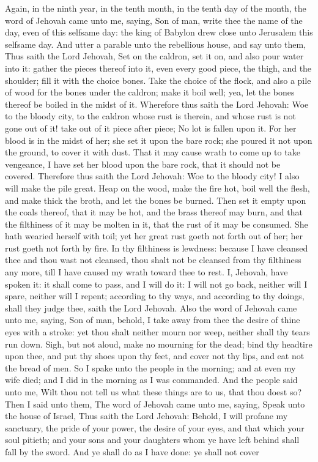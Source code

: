 Again, in the ninth year, in the tenth month, in the tenth day of the month, the word of Jehovah came unto me, saying, Son of man, write thee the name of the day, even of this selfsame day: the king of Babylon drew close unto Jerusalem this selfsame day. And utter a parable unto the rebellious house, and say unto them, Thus saith the Lord Jehovah, Set on the caldron, set it on, and also pour water into it: gather the pieces thereof into it, even every good piece, the thigh, and the shoulder; fill it with the choice bones. Take the choice of the flock, and also a pile of wood for the bones under the caldron; make it boil well; yea, let the bones thereof be boiled in the midst of it.  Wherefore thus saith the Lord Jehovah: Woe to the bloody city, to the caldron whose rust is therein, and whose rust is not gone out of it! take out of it piece after piece; No lot is fallen upon it. For her blood is in the midst of her; she set it upon the bare rock; she poured it not upon the ground, to cover it with dust. That it may cause wrath to come up to take vengeance, I have set her blood upon the bare rock, that it should not be covered. Therefore thus saith the Lord Jehovah: Woe to the bloody city! I also will make the pile great. Heap on the wood, make the fire hot, boil well the flesh, and make thick the broth, and let the bones be burned. Then set it empty upon the coals thereof, that it may be hot, and the brass thereof may burn, and that the filthiness of it may be molten in it, that the rust of it may be consumed. She hath wearied herself with toil; yet her great rust goeth not forth out of her; her rust goeth not forth by fire. In thy filthiness is lewdness: because I have cleansed thee and thou wast not cleansed, thou shalt not be cleansed from thy filthiness any more, till I have caused my wrath toward thee to rest. I, Jehovah, have spoken it: it shall come to pass, and I will do it: I will not go back, neither will I spare, neither will I repent; according to thy ways, and according to thy doings, shall they judge thee, saith the Lord Jehovah.  Also the word of Jehovah came unto me, saying, Son of man, behold, I take away from thee the desire of thine eyes with a stroke: yet thou shalt neither mourn nor weep, neither shall thy tears run down. Sigh, but not aloud, make no mourning for the dead; bind thy headtire upon thee, and put thy shoes upon thy feet, and cover not thy lips, and eat not the bread of men. So I spake unto the people in the morning; and at even my wife died; and I did in the morning as I was commanded.  And the people said unto me, Wilt thou not tell us what these things are to us, that thou doest so? Then I said unto them, The word of Jehovah came unto me, saying, Speak unto the house of Israel, Thus saith the Lord Jehovah: Behold, I will profane my sanctuary, the pride of your power, the desire of your eyes, and that which your soul pitieth; and your sons and your daughters whom ye have left behind shall fall by the sword. And ye shall do as I have done: ye shall not cover 